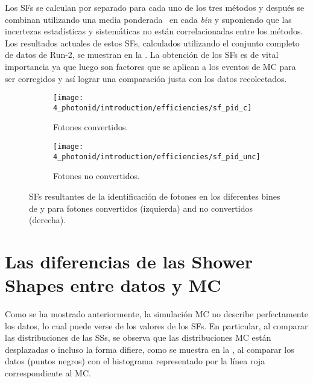 Los \acp{SF} se calculan por separado para cada uno de los tres métodos y después se combinan utilizando una media ponderada~\cite{BLUEMethod} en cada \textit{bin} y suponiendo que las incertezas estadísticas y sistemáticas no están correlacionadas entre los métodos. Los resultados actuales de estos \acp{SF}, calculados utilizando el conjunto completo de datos de Run-2, se muestran en la \Fig{\ref{fig:pid_ss:pid:efficiencies:sfs}}. La obtención de los \acp{SF} es de vital importancia ya que luego son factores que se aplican a los eventos de \ac{MC} para ser corregidos y así lograr una comparación justa con los datos recolectados.

\begin{figure}[ht!]
    \centering
    \begin{subfigure}[h]{0.49\linewidth}
        \centering
        \texttt{[image: 4\_photonid/introduction/efficiencies/sf\_pid\_c]}
        \caption{Fotones convertidos.}
    \end{subfigure}
    \hfill
    \begin{subfigure}[h]{0.49\linewidth}
        \centering
        \texttt{[image: 4\_photonid/introduction/efficiencies/sf\_pid\_unc]}
        \caption{Fotones no convertidos.}
    \end{subfigure}
    \caption{\acp{SF} resultantes de la identificación de fotones en los diferentes bines de \pt y \abseta para fotones convertidos (izquierda) and no convertidos (derecha).}
    \label{fig:pid_ss:pid:efficiencies:sfs}
\end{figure}


\section{Las diferencias de las Shower Shapes entre datos y MC}
\label{sec:pid_ss:ss_differences}


Como se ha mostrado anteriormente, la simulación \ac{MC} no describe perfectamente los datos, lo cual puede verse de los valores de los \acp{SF}. En particular, al comparar las distribuciones de las \acp{SS}, se observa que las distribuciones \ac{MC} están desplazadas o incluso la forma difiere, como se muestra en la \Fig{\ref{fig:pid_ss:ss_differences:ss}}, al comparar los datos (puntos negros) con el histograma representado por la línea roja correspondiente al \ac{MC}.

